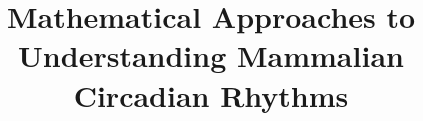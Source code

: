 \documentclass[12pt,letterpaper,oneside]{book}
\title{Mathematical Approaches to Understanding Mammalian Circadian Rhythms}
\begin{document}
\doublespace
\frontmatter






\tableofcontents
\listoffigures

\mainmatter








\backmatter
{\singlespace


}
\end{document}
